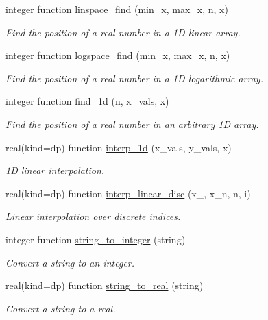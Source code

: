\begin{DoxyCompactItemize}
integer function \mbox{\hyperlink{namespacepmc__util_a1d5f058ff11d51e9083950422757e8b7}{linspace\+\_\+find}} (min\+\_\+x, max\+\_\+x, n, x)
\begin{DoxyCompactList}\small\item\em Find the position of a real number in a 1D linear array. \end{DoxyCompactList}\item 
integer function \mbox{\hyperlink{namespacepmc__util_a8679b1591949031ddac4234e457fe048}{logspace\+\_\+find}} (min\+\_\+x, max\+\_\+x, n, x)
\begin{DoxyCompactList}\small\item\em Find the position of a real number in a 1D logarithmic array. \end{DoxyCompactList}\item 
integer function \mbox{\hyperlink{namespacepmc__util_ac91afc829f34ff168c29ebd00f560cb2}{find\+\_\+1d}} (n, x\+\_\+vals, x)
\begin{DoxyCompactList}\small\item\em Find the position of a real number in an arbitrary 1D array. \end{DoxyCompactList}\item 
real(kind=dp) function \mbox{\hyperlink{namespacepmc__util_aa7405c9d93fafa02adb9b51f7a8acadf}{interp\+\_\+1d}} (x\+\_\+vals, y\+\_\+vals, x)
\begin{DoxyCompactList}\small\item\em 1D linear interpolation. \end{DoxyCompactList}\item 
real(kind=dp) function \mbox{\hyperlink{namespacepmc__util_a6b98d6e94a23e0223f1e78ee4cbdca64}{interp\+\_\+linear\+\_\+disc}} (x\+\_, x\+\_\+n, n, i)
\begin{DoxyCompactList}\small\item\em Linear interpolation over discrete indices. \end{DoxyCompactList}\item 
integer function \mbox{\hyperlink{namespacepmc__util_aa4e6c3a50b7def19b9ce4cf85a0816ca}{string\+\_\+to\+\_\+integer}} (string)
\begin{DoxyCompactList}\small\item\em Convert a string to an integer. \end{DoxyCompactList}\item 
real(kind=dp) function \mbox{\hyperlink{namespacepmc__util_a1d18d4c7adea4978d104517da57995ef}{string\+\_\+to\+\_\+real}} (string)
\begin{DoxyCompactList}\small\item\em Convert a string to a real. \end{DoxyCompactList}\item 

\end{DoxyCompactItemize}
